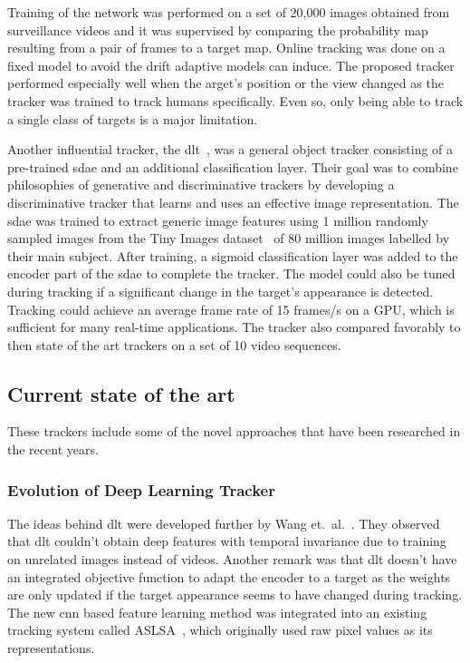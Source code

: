 Training of the network was performed on a set of 20,000 images obtained from
surveillance videos and it was supervised by comparing the probability map resulting from
a pair of frames to a target map. Online tracking was done on a fixed model to avoid the
drift adaptive models can induce. The proposed tracker performed especially well when the
arget's position or the view changed as the tracker was trained to track humans
specifically. Even so, only being able to track a single class of targets is a major
limitation.~\cite{HUMAN_CNN}

Another influential tracker, the \ac{dlt}~\cite{DLT}, was a general object tracker
consisting of a pre-trained \ac{sdae} and an additional classification layer. Their goal
was to combine philosophies of generative and discriminative trackers by developing a
discriminative tracker that learns and uses an effective image representation. The
\ac{sdae} was trained to extract generic image features using 1 million randomly sampled
images from the Tiny Images dataset~\cite{TINY_IMAGES} of 80 million images labelled by
their main subject. After training, a sigmoid classification layer was added to the
encoder part of the \ac{sdae} to complete the tracker. The model could also be tuned
during tracking if a significant change in the target's appearance is detected. Tracking
could achieve an average frame rate of 15 frames/s on a GPU, which is sufficient for many
real-time applications. The tracker also compared favorably to then state of the art
trackers on a set of 10 video sequences.~\cite{DLT}

\subsection{Current state of the art}
These trackers include some of the novel approaches that have been researched in the
recent years.

\subsubsection{Evolution of Deep Learning Tracker}
The ideas behind \ac{dlt} were developed further by Wang et.~al.~\cite{LEARNED_HIERARCH}.
They observed that \ac{dlt} couldn't obtain deep features with temporal invariance due to
training on unrelated images instead of videos. Another remark was that \ac{dlt} doesn't
have an integrated objective function to adapt the encoder to a target as the weights are
only updated if the target appearance seems to have changed during tracking. The new
\ac{cnn} based feature learning method was integrated into an existing tracking system
called ASLSA~\cite{ASLSA}, which originally used raw pixel values as its
representations.~\cite{LEARNED_HIERARCH}

